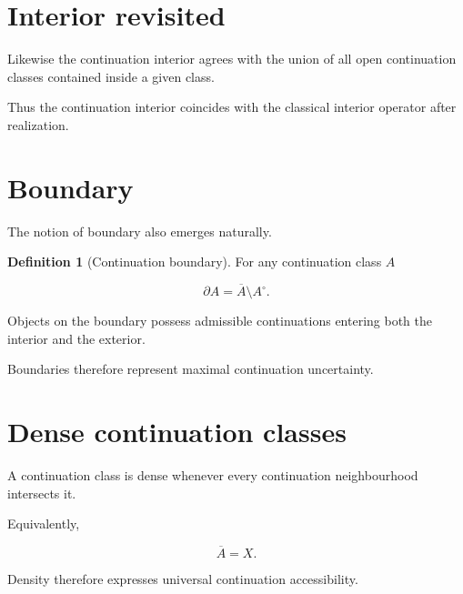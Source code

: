 \documentclass[13pt,openany]{book}
\theoremstyle{plain}
\theoremstyle{definition}
\newtheorem{definition}{Definition}[chapter]
\begin{document}
\section{Interior revisited}

Likewise the continuation interior agrees with the union of all open continuation classes contained inside a given class.

Thus the continuation interior coincides with the classical interior operator after realization.

\section{Boundary}

The notion of boundary also emerges naturally.

\begin{definition}[Continuation boundary]

For any continuation class $A$

\[
\partial A
=
\overline{A}
\setminus
A^\circ .
\]

\end{definition}

Objects on the boundary possess admissible continuations entering both the interior and the exterior.

Boundaries therefore represent maximal continuation uncertainty.

\section{Dense continuation classes}

A continuation class is dense whenever every continuation neighbourhood intersects it.

Equivalently,

\[
\overline{A}=X.
\]

Density therefore expresses universal continuation accessibility.

\end{document}

